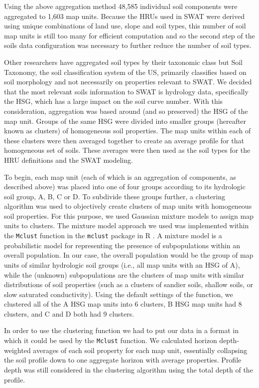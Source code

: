 Using the above aggregation method 48,585 individual soil components were
aggregated to 1,603 map units. Because the HRUs used in
SWAT were derived using unique combinations of land use, slope and soil types,
this number of soil map units is still too many for efficient computation  and so
the second step of the soils data configuration was necessary to further reduce
the number of soil types.

Other researchers have aggregated soil types by their taxonomic class
\citep{gatzke_aggregation_2011} but Soil Taxonomy, the soil classification system of the US, primarily classifies based on soil morphology and not
necessarily on properties relevant to SWAT. We decided that the most relevant soils
information to SWAT is hydrology data, specifically the HSG, which has a large impact on the soil curve number. With this
consideration, aggregation was based around (and so preserved) the HSG of the
map unit. Groups of the same HSG were divided into smaller groups (hereafter
known as clusters) of homogeneous soil properties. The map units within each of these clusters were then averaged together to create an average profile for that homogeneous set of soils. These averages were then
used as the soil types for the HRU definitions and the SWAT modeling.

To begin, each map unit (each of which is an aggregation of components, as described above)
 was placed into one of four groups according to its hydrologic soil
group, A, B, C or D. To subdivide these groups further, a clustering algorithm
was used to objectively create clusters of map units with
homogeneous soil properties. For this purpose, we used Gaussian mixture models to
assign map units to clusters. The mixture model approach we used was implemented within the
\texttt{Mclust} function in the \texttt{mclust} package in R \citep{fraley_mclust_2012}.
A mixture model is a probabilistic model for representing the presence of
subpopulations within an overall population. In our case, the overall population
would be the group of map units of similar hydrologic soil groups (i.e., all map units
with an HSG of A), while the (unknown) subpopulations are the clusters of
map units with similar distributions of soil properties (such as a clusters of
sandier soils, shallow soils, or slow saturated conductivity). Using the default
settings of the function, we clustered all of the A HSG map units into
6 clusters, B HSG map units had 8 clusters, and C and D both had 9 clusters.

In order to use the clustering function we had to put our data in a format in which it could 
be used by the \texttt{Mclust} function. We calculated horizon depth-weighted averages of each soil property for each map unit, essentially collapsing the soil profile down to one aggregate horizon with average properties. Profile depth was still
considered in the clustering algorithm using the total depth of the profile.

